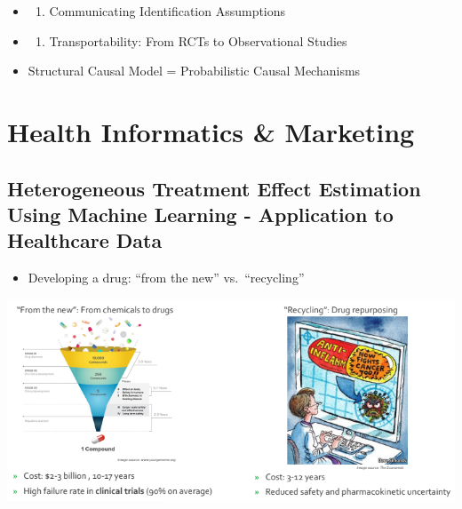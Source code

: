 \documentclass[
]{book}
\providecommand{\tightlist}{%
  \setlength{\itemsep}{0pt}\setlength{\parskip}{0pt}}
\theoremstyle{definition}
\theoremstyle{definition}
\theoremstyle{definition}
\theoremstyle{definition}
\theoremstyle{remark}
\begin{document}
\begin{itemize}
\item
  \begin{enumerate}
  \def\labelenumi{(\arabic{enumi})}
  \setcounter{enumi}{2}
  \tightlist
  \item
    Communicating Identification Assumptions
  \end{enumerate}
\item
  \begin{enumerate}
  \def\labelenumi{(\arabic{enumi})}
  \setcounter{enumi}{3}
  \tightlist
  \item
    Transportability: From RCTs to Observational Studies
  \end{enumerate}
\item
  Structural Causal Model = Probabilistic Causal Mechanisms
\end{itemize}

\hypertarget{health-informatics-marketing}{%
\section{Health Informatics \& Marketing}\label{health-informatics-marketing}}

\hypertarget{heterogeneous-treatment-effect-estimation-using-machine-learning---application-to-healthcare-data}{%
\subsection{Heterogeneous Treatment Effect Estimation Using Machine Learning - Application to Healthcare Data}\label{heterogeneous-treatment-effect-estimation-using-machine-learning---application-to-healthcare-data}}

\begin{itemize}
\tightlist
\item
  Developing a drug: ``from the new'' vs.~``recycling''
\end{itemize}

\includegraphics{figures/04.png}
\end{document}
